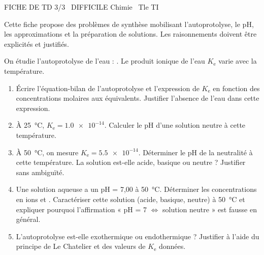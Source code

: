 \documentclass[11pt]{article}
\begin{document}
\begin{tcolorbox}[enhanced,colback=popink,colframe=popink,arc=10pt,boxrule=0pt,left=12pt,right=12pt,top=9pt,bottom=9pt]
{\color{white}\popxbold\small FICHE DE TD 3/3 \textbullet\ DIFFICILE \hfill Chimie \textbullet\ Tle TI\par}
\end{tcolorbox}
\vspace{4pt}
Cette fiche propose des problèmes de synthèse mobilisant l'autoprotolyse, le pH, les approximations et la préparation de solutions. Les raisonnements doivent être explicités et justifiés.

\begin{exercice}
On étudie l'autoprotolyse de l'eau : . Le produit ionique de l'eau $K_{\text{e}}$ varie avec la température.
\begin{enumerate}
    \item Écrire l'équation-bilan de l'autoprotolyse et l'expression de $K_{\text{e}}$ en fonction des concentrations molaires aux équivalents. Justifier l'absence de l'eau dans cette expression.
    \item À \SI{25}{\celsius}, $K_{\text{e}} = \num{1,0e-14}$. Calculer le pH d'une solution neutre à cette température.
    \item À \SI{50}{\celsius}, on mesure $K_{\text{e}} = \num{5,5e-14}$. Déterminer le pH de la neutralité à cette température. La solution est-elle acide, basique ou neutre ? Justifier sans ambiguïté.
    \item Une solution aqueuse a un pH = 7,00 à \SI{50}{\celsius}. Déterminer les concentrations en ions  et . Caractériser cette solution (acide, basique, neutre) à \SI{50}{\celsius} et expliquer pourquoi l'affirmation « pH = 7 $\iff$ solution neutre » est fausse en général.
    \item L'autoprotolyse est-elle exothermique ou endothermique ? Justifier à l'aide du principe de Le Chatelier et des valeurs de $K_{\text{e}}$ données.
\end{enumerate}
\end{exercice}
\end{document}
